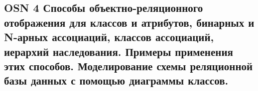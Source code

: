 \subsection{OSN 4 Способы объектно-реляционного отображения для классов и атрибутов, бинарных и N-арных ассоциаций, классов ассоциаций, иерархий наследования. Примеры применения этих способов. Моделирование схемы реляционной базы данных с помощью диаграммы классов.}
